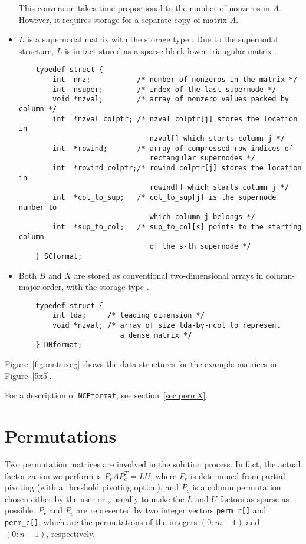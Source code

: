 \begin{itemize}
This conversion takes time proportional to the number of nonzeros in $A$.
However, it requires storage for a separate copy of matrix $A$.

\item
$L$ is a supernodal matrix with the storage type {\SC}.
Due to the supernodal structure, $L$ is in fact stored as a 
sparse block lower triangular matrix~\cite{superlu99}.

\begin{verbatim}
    typedef struct {
        int  nnz;           /* number of nonzeros in the matrix */
        int  nsuper;        /* index of the last supernode */
        void *nzval;        /* array of nonzero values packed by column */
        int  *nzval_colptr; /* nzval_colptr[j] stores the location in
                               nzval[] which starts column j */
        int  *rowind;       /* array of compressed row indices of 
                               rectangular supernodes */
        int  *rowind_colptr;/* rowind_colptr[j] stores the location in
                               rowind[] which starts column j */
        int  *col_to_sup;   /* col_to_sup[j] is the supernode number to 
                               which column j belongs */
        int  *sup_to_col;   /* sup_to_col[s] points to the starting column
                               of the s-th supernode */
    } SCformat;
\end{verbatim}

\item
Both $B$ and $X$ are stored as conventional two-dimensional arrays in
column-major order, with the storage type {\DN}.
\begin{verbatim}
    typedef struct {
        int lda;     /* leading dimension */
        void *nzval; /* array of size lda-by-ncol to represent 
                        a dense matrix */
    } DNformat;
\end{verbatim}
\end{itemize}

Figure~\ref{fig:matrixeg} shows the data structures for the %
example matrices in Figure~\ref{5x5}.

For a description of {\tt NCPformat}, see section~\ref{sec:permX}.



\section{Permutations}
\label{sec:perm}
Two permutation matrices are involved in the solution process. In fact, 
the actual factorization
we perform is $P_rAP_c^T=LU$, where $P_r$ is determined from partial pivoting 
(with a threshold pivoting option), and $P_c$ is a column permutation
chosen either by the user or {\SuperLU}, usually to make the $L$
and $U$ factors as sparse as possible.
$P_r$ and $P_c$ are represented by two integer vectors
{\tt perm\_r[]} and {\tt perm\_c[]}, which are the permutations
of the integers $(0:m-1)$ and $(0:n-1)$, respectively.


